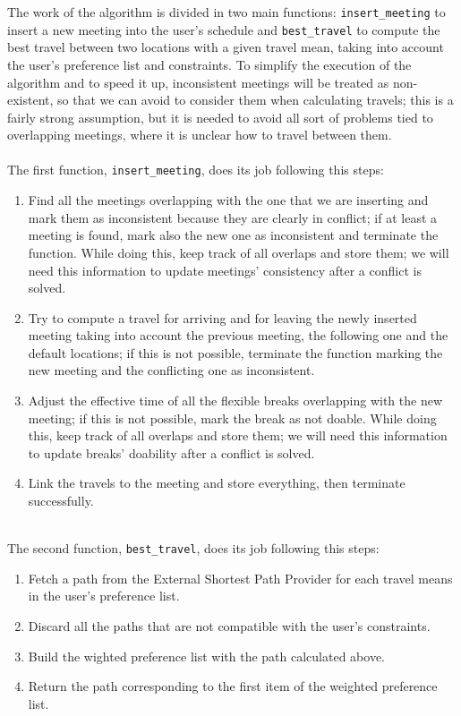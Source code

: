The work of the algorithm is divided in two main functions: \texttt{insert\_meeting} to insert a new meeting into the user's schedule and \texttt{best\_travel} to compute the best travel between two locations with a given travel mean, taking into account the user's preference list and constraints. To simplify the execution of the algorithm and to speed it up, inconsistent meetings will be treated as non-existent, so that we can avoid to consider them when calculating travels; this is a fairly strong assumption, but it is needed to avoid all sort of problems tied to overlapping meetings, where it is unclear how to travel between them. \\
\\
The first function, \texttt{insert\_meeting}, does its job following this steps:
\begin{enumerate}
\item Find all the meetings overlapping with the one that we are inserting and mark them as inconsistent because they are clearly in conflict; if at least a meeting is found, mark also the new one as inconsistent and terminate the function. While doing this, keep track of all overlaps and store them; we will need this information to update meetings' consistency after a conflict is solved.
\item Try to compute a travel for arriving and for leaving the newly inserted meeting taking into account the previous meeting, the following one and the default locations; if this is not possible, terminate the function marking the new meeting and the conflicting one as inconsistent.
\item Adjust the effective time of all the flexible breaks overlapping with the new meeting; if this is not possible, mark the break as not doable. While doing this, keep track of all overlaps and store them; we will need this information to update breaks' doability after a conflict is solved.
\item Link the travels to the meeting and store everything, then terminate successfully.
\end{enumerate}
\\
The second function, \texttt{best\_travel}, does its job following this steps:
\begin{enumerate}
\item Fetch a path from the External Shortest Path Provider for each travel means in the user's preference list.
\item Discard all the paths that are not compatible with the user's constraints.
\item Build the wighted preference list with the path calculated above.
\item Return the path corresponding to the first item of the weighted preference list.
\end{enumerate}